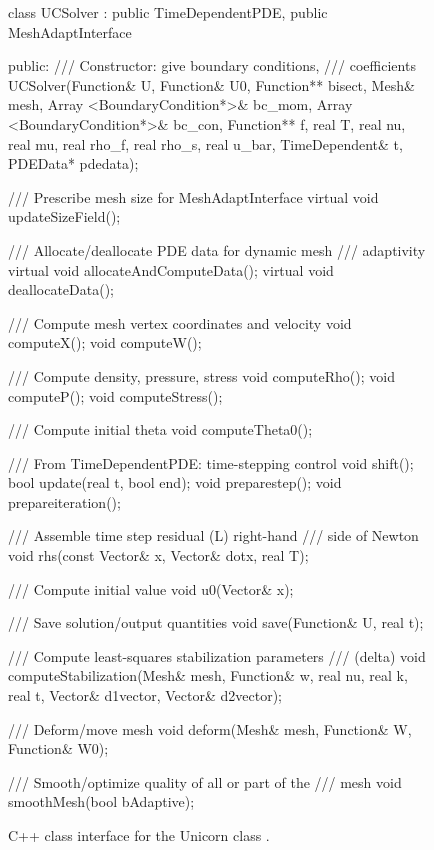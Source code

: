 \begin{figure}
\begin{c++}
class UCSolver :
  public TimeDependentPDE, public MeshAdaptInterface
{
public:
  /// Constructor: give boundary conditions,
  /// coefficients
  UCSolver(Function& U, Function& U0,
           Function** bisect, Mesh& mesh,
           Array <BoundaryCondition*>& bc_mom,
           Array <BoundaryCondition*>& bc_con,
           Function** f, real T, real nu,
           real mu, real rho_f, real rho_s,
           real u_bar, TimeDependent& t,
           PDEData* pdedata);

  /// Prescribe mesh size for MeshAdaptInterface
  virtual void updateSizeField();

  /// Allocate/deallocate PDE data for dynamic mesh
  /// adaptivity
  virtual void allocateAndComputeData();
  virtual void deallocateData();

  /// Compute mesh vertex coordinates and velocity
  void computeX();
  void computeW();

  /// Compute density, pressure, stress
  void computeRho();
  void computeP();
  void computeStress();

  /// Compute initial theta
  void computeTheta0();

  /// From TimeDependentPDE: time-stepping control
  void shift();
  bool update(real t, bool end);
  void preparestep();
  void prepareiteration();

  /// Assemble time step residual (L) right-hand
  /// side of Newton
  void rhs(const Vector& x, Vector& dotx, real T);

  /// Compute initial value
  void u0(Vector& x);

  /// Save solution/output quantities
  void save(Function& U, real t);

  /// Compute least-squares stabilization parameters
  /// (delta)
  void computeStabilization(Mesh& mesh, Function& w,
                            real nu, real k, real t,
                            Vector& d1vector,
                            Vector& d2vector);

  /// Deform/move mesh
  void deform(Mesh& mesh, Function& W, Function& W0);

  /// Smooth/optimize quality of all or part of the
  /// mesh
  void smoothMesh(bool bAdaptive);
}
\end{c++}
\caption{C++ class interface for the Unicorn class .}
\label{code:UCSolver}
\end{figure}

